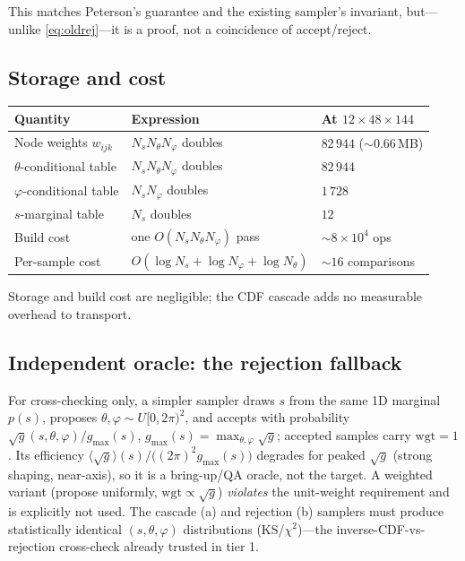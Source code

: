 \documentclass[11pt]{article}
\newcommand{\sg}{\sqrt{g}}
\begin{document}
This matches Peterson's guarantee and the existing sampler's invariant, but---unlike
\eqref{eq:oldrej}---it is a proof, not a coincidence of accept/reject.

\subsection{Storage and cost}

\begin{center}
\begin{tabular}{lll}
\hline
Quantity & Expression & At $12\times48\times144$\\
\hline
Node weights $w_{ijk}$ & $N_s N_\theta N_\varphi$ doubles & $82\,944$ ($\sim$0.66\,MB)\\
$\theta$-conditional table & $N_s N_\theta N_\varphi$ doubles & $82\,944$\\
$\varphi$-conditional table & $N_s N_\varphi$ doubles & $1\,728$\\
$s$-marginal table & $N_s$ doubles & $12$\\
Build cost & one $O(N_s N_\theta N_\varphi)$ pass & $\sim8\times10^4$ ops\\
Per-sample cost & $O(\log N_s+\log N_\varphi+\log N_\theta)$ & $\sim16$ comparisons\\
\hline
\end{tabular}
\end{center}
Storage and build cost are negligible; the CDF cascade adds no measurable overhead to
transport.

\subsection{Independent oracle: the rejection fallback}

For cross-checking only, a simpler sampler draws $s$ from the same 1D marginal
$p(s)$, proposes $\theta,\varphi\sim U[0,2\pi)^2$, and accepts with probability
$\sg(s,\theta,\varphi)/g_{\max}(s)$, $g_{\max}(s)=\max_{\theta,\varphi}\sg$; accepted
samples carry $\mathrm{wgt}=1$. Its efficiency
$\langle\sg\rangle(s)/\big((2\pi)^2 g_{\max}(s)\big)$ degrades for peaked $\sg$
(strong shaping, near-axis), so it is a bring-up/QA oracle, not the target. A
weighted variant (propose uniformly, $\mathrm{wgt}\propto\sg$) \emph{violates} the
unit-weight requirement and is explicitly not used. The cascade (a) and rejection (b)
samplers must produce statistically identical $(s,\theta,\varphi)$ distributions
(KS/$\chi^2$)---the inverse-CDF-vs-rejection cross-check already trusted in tier 1.
\end{document}
